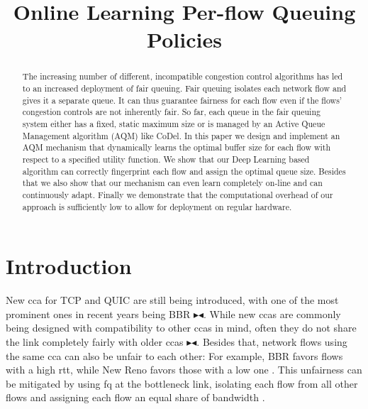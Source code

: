 \documentclass[10pt,sigconf,letterpaper,anonymous]{acmart}
\newcommand{\mynote}[3]{
    \fbox{\bfseries\sffamily\scriptsize#1}
    {\small$\blacktriangleright$\textsf{\emph{\color{#3}{#2}}}$\blacktriangleleft$}}
\newcommand{\todo}[1]{\mynote{TODO}{#1}{red}}
\begin{document}
\title{Online Learning Per-flow Queuing Policies}



\begin{abstract}
The increasing number of different, incompatible congestion control algorithms has led to an increased deployment of fair queuing. Fair queuing isolates each network flow and gives it a separate queue. It can thus guarantee fairness for each flow even if the flows' congestion controls are not inherently fair. So far, each queue in the fair queuing system either has a fixed, static maximum size or is managed by an Active Queue Management algorithm (AQM) like CoDel. In this paper we design and implement an AQM mechanism that dynamically learns the optimal buffer size for each flow with respect to a specified utility function. We show that our Deep Learning based algorithm can correctly fingerprint each flow and assign the optimal queue size. Besides that we also show that our mechanism can even learn completely on-line and can continuously adapt. Finally we demonstrate that the computational overhead of our approach is sufficiently low to allow for deployment on regular hardware. 
\end{abstract}

\maketitle

\section{Introduction}

New \gls{cca} for TCP and QUIC are still being introduced, with one of the most prominent ones in recent years being BBR \cite{cardwell_bbr:_2016}\todo{Add more refs}. While new \glspl{cca} are commonly being designed with compatibility to other \glspl{cca} in mind, often they do not share the link completely fairly with older \glspl{cca}\todo{Add more refs}. Besides that, network flows using the same \gls{cca} can also be unfair to each other: For example, BBR favors flows with a high \gls{rtt}, while New Reno favors those with a low one \cite{turkovic_interactions_2019,turkovic_fifty_2019}. This unfairness can be mitigated by using \gls{fq} at the bottleneck link, isolating each flow from all other flows and assigning each flow an equal share of bandwidth \cite{dumazet_pkt_sched:_2013}. 
\end{document}
